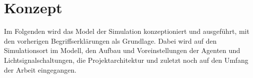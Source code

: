 %


\chapter{Konzept}\label{ch:konzept}

Im Folgenden wird das Model der Simulation konzeptioniert und ausgeführt, mit den vorherigen Begriffserklärungen als Grundlage.
Dabei wird auf den Simulationsort im Modell, den Aufbau und Voreinstellungen der Agenten und Lichtsignalschaltungen, die Projektarchitektur und zuletzt noch auf den Umfang der Arbeit eingegangen.







